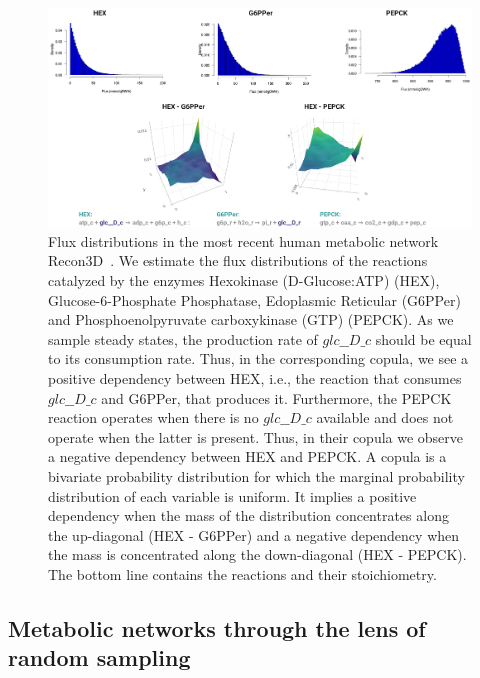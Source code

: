    \begin{figure}[h]
      \centering
      \includegraphics[width=125mm]{figures/copulas_cropped.png}
      \caption[Flux distributions in the most recent human metabolic network Recon3D]{
         Flux distributions in the most recent human metabolic network Recon3D~\citep{brunk2018recon3d}. 
         We estimate the flux distributions of the reactions catalyzed by the enzymes Hexokinase (D-Glucose:ATP) (HEX), Glucose-6-Phosphate Phosphatase, Edoplasmic Reticular (G6PPer)
         and Phosphoenolpyruvate carboxykinase (GTP) (PEPCK).
         As we sample steady states, the production rate of $glc\_\_D \_c$ should be equal to its consumption rate. 
         Thus, in the corresponding copula, we see a positive dependency between HEX,
         i.e., the reaction that consumes $glc\_\_D \_c$ and G6PPer, that produces it.
         Furthermore, the PEPCK reaction operates when there is no $glc\_\_D\_c$ available and does not operate when the latter is present.
         Thus, in their copula we observe a negative dependency between HEX and PEPCK.
         A copula is a bivariate probability distribution for which the marginal probability distribution of each variable is uniform.
         It implies a positive dependency when the mass of the distribution concentrates along the up-diagonal (HEX - G6PPer)
         and a negative dependency when the mass is concentrated along the down-diagonal (HEX - PEPCK). %
         The bottom line contains the  reactions and their stoichiometry.
      }
      \label{fig:copulas}
   \end{figure}

   \subsection{Metabolic networks through the lens of random sampling} 
   \label{subsec:previous_work}

